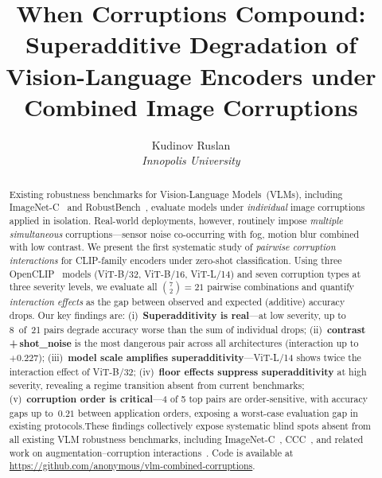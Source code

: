 \documentclass[10pt, twocolumn]{article}
\begin{document}
\title{
  \textbf{When Corruptions Compound: Superadditive Degradation of\\
  Vision-Language Encoders under Combined Image Corruptions}
}

\author{
  Kudinov Ruslan\\
  \textit{Innopolis University}
}
\date{}
\maketitle

\begin{abstract}
Existing robustness benchmarks for Vision-Language Models~(VLMs),
including ImageNet-C~\cite{hendrycks2019benchmarking} and
RobustBench~\cite{croce2021robustbench}, evaluate models under
\emph{individual} image corruptions applied in isolation.
Real-world deployments, however, routinely impose
\emph{multiple simultaneous} corruptions---sensor noise
co-occurring with fog, motion blur combined with low contrast.
We present the first systematic study of
\emph{pairwise corruption interactions} for CLIP-family encoders
under zero-shot classification.
Using three OpenCLIP~\cite{ilharco2021openclip} models
(ViT-B/32, ViT-B/16, ViT-L/14) and seven corruption types
at three severity levels, we evaluate all $\binom{7}{2}=21$
pairwise combinations and quantify \emph{interaction effects}
as the gap between observed and expected (additive) accuracy drops.
Our key findings are:
(i)~\textbf{Superadditivity is real}---at low severity,
up to 8~of~21 pairs degrade accuracy worse than the sum of
individual drops;
(ii)~\textbf{contrast\,+\,shot\_noise} is the most dangerous
pair across all architectures (interaction up to $+0.227$);
(iii)~\textbf{model scale amplifies superadditivity}---ViT-L/14
shows twice the interaction effect of ViT-B/32;
(iv)~\textbf{floor effects suppress superadditivity} at high
severity, revealing a regime transition absent from current
benchmarks;
(v)~\textbf{corruption order is critical}---4 of 5 top pairs
are order-sensitive, with accuracy gaps up to~$0.21$ between
application orders, exposing a worst-case evaluation gap in
existing protocols.These findings collectively expose systematic blind spots
absent from all existing VLM robustness benchmarks,
including ImageNet-C~\cite{hendrycks2019benchmarking},
CCC~\cite{press2023rdumb}, and related work on
augmentation--corruption interactions~\cite{chen2021augcorr}.
Code is available at
\url{https://github.com/anonymous/vlm-combined-corruptions}.
\end{abstract}
\end{document}
